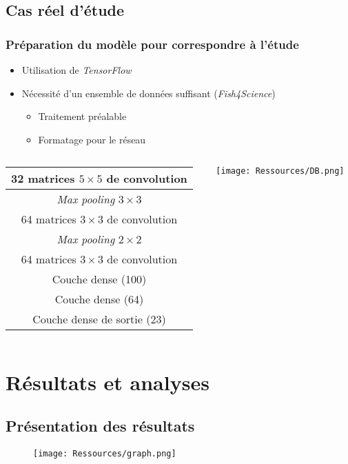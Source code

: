 \documentclass{beamer}
\begin{document}
  \subsection{Cas réel d'étude}
  \begin{frame}
    \frametitle{Préparation du modèle pour correspondre à l'étude}
    \begin{itemize}
      \item Utilisation de \textit{TensorFlow}
      \item Nécessité d'un ensemble de données suffisant (\textit{Fish4Science})
      \begin{itemize}
        \item Traitement préalable
        \item Formatage pour le réseau
      \end{itemize}
    \end{itemize}
    \begin{columns}
      \begin{column}{0.3\textwidth}
        \tiny\begin{tabular}{|c|} \hline
          32 matrices $5\times5$ de convolution \\ \hline
          \textit{Max pooling} $3\times3$ \\ \hline
          64 matrices $3\times3$ de convolution \\ \hline
          \textit{Max pooling} $2\times2$ \\ \hline
          64 matrices $3\times3$ de convolution \\ \hline
          Couche dense (100) \\ \hline
          Couche dense (64) \\ \hline
          Couche dense de sortie (23) \\ \hline
        \end{tabular}
      \end{column}
      \begin{column}{0.7\textwidth}
        \texttt{[image: Ressources/DB.png]}
      \end{column}
    \end{columns}
  \end{frame}

  \section{Résultats et analyses}
  \subsection{Présentation des résultats}
  \begin{figure}
    \texttt{[image: Ressources/graph.png]}
  \end{figure}
  \begin{frame}
    \nocite{3B1B:2018, Branson:2014, Rathi:2018, Rojas:1996, TF}
    
    {\selectfont
      
    }
  \end{frame}
\end{document}
